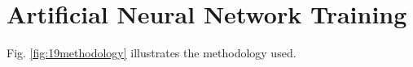 
\chapter{Artificial Neural Network Training}
\label{cap:anntraining}

Fig. \ref{fig:19methodology} illustrates the methodology used.



